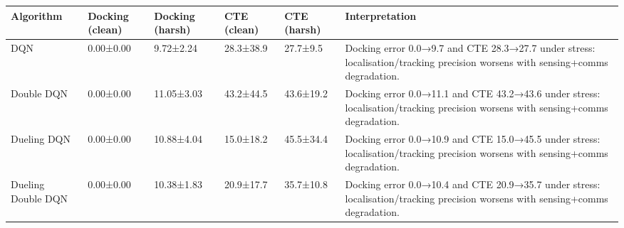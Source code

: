\begin{tabular}{llllll}
\toprule
Algorithm & Docking (clean) & Docking (harsh) & CTE (clean) & CTE (harsh) & Interpretation \\
\midrule
DQN & 0.00±0.00 & 9.72±2.24 & 28.3±38.9 & 27.7±9.5 & Docking error 0.0→9.7 and CTE 28.3→27.7 under stress: localisation/tracking precision worsens with sensing+comms degradation. \\
Double DQN & 0.00±0.00 & 11.05±3.03 & 43.2±44.5 & 43.6±19.2 & Docking error 0.0→11.1 and CTE 43.2→43.6 under stress: localisation/tracking precision worsens with sensing+comms degradation. \\
Dueling DQN & 0.00±0.00 & 10.88±4.04 & 15.0±18.2 & 45.5±34.4 & Docking error 0.0→10.9 and CTE 15.0→45.5 under stress: localisation/tracking precision worsens with sensing+comms degradation. \\
Dueling Double DQN & 0.00±0.00 & 10.38±1.83 & 20.9±17.7 & 35.7±10.8 & Docking error 0.0→10.4 and CTE 20.9→35.7 under stress: localisation/tracking precision worsens with sensing+comms degradation. \\
\bottomrule
\end{tabular}

